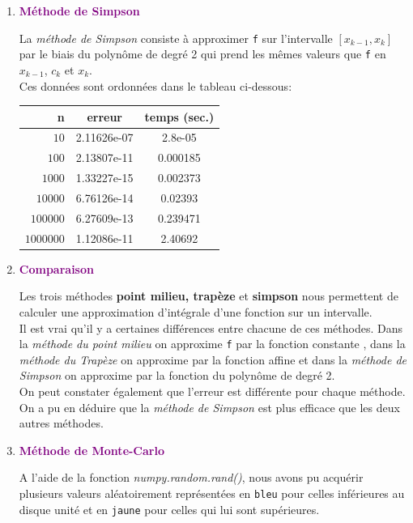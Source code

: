 \documentclass{article}
\begin{document}
\begin{enumerate}
\item{\bf\textcolor{purple} {Méthode de Simpson}}\vskip 0.7cm

La \textit{méthode de Simpson} consiste à approximer \texttt{f} sur l'intervalle $[x_{k-1}, x_k]$ par le biais du polynôme de degré 2 qui prend les mêmes valeurs que \texttt{f} en $x_{k-1}$, $c_k$ et $x_k$.\\

	Ces données sont ordonnées dans le tableau ci-dessous: \\

\begin{center}
\begin{tabular}{r | c | c}
{n} & erreur & temps (sec.)\\
\hline
$10$ & {2.11626e-07} & {2.8e-05}\\
$100$ & {2.13807e-11 } & {0.000185}\\
$1000$ & {1.33227e-15} & {0.002373}\\
$10000$ & {6.76126e-14} & {0.02393}\\
$100000$ & {6.27609e-13} & {0.239471}\\
$1000000$ & {1.12086e-11} & {2.40692}
\end{tabular}
\end{center}

\item{\bf\textcolor{purple} {Comparaison}}\vskip 0.7cm

Les trois méthodes \textbf{point milieu, trapèze} et \textbf{simpson} nous permettent de calculer une approximation d'intégrale d'une fonction sur un intervalle. 
\\

	
	Il est vrai qu'il y a certaines différences entre chacune de ces méthodes. Dans la \textit{méthode du point milieu} on approxime \texttt{f} par la fonction constante , dans la \textit{méthode du Trapèze} on approxime par la fonction affine et dans la \textit{méthode de Simpson} on approxime par la fonction du polynôme de degré 2. 
\\

	On peut constater également que l'erreur est différente pour chaque méthode. On a pu en déduire que la \textit{méthode de Simpson} est plus efficace que les deux autres méthodes.

\item{\bf\textcolor{purple} {Méthode de Monte-Carlo}}\vskip 0.7cm

A l'aide de la fonction \textit{numpy.random.rand()}, nous avons pu acquérir plusieurs valeurs aléatoirement représentées en \texttt{bleu} pour celles inférieures au disque unité et en \texttt{jaune} pour celles qui lui sont supérieures.



\end{enumerate}
\end{document}
